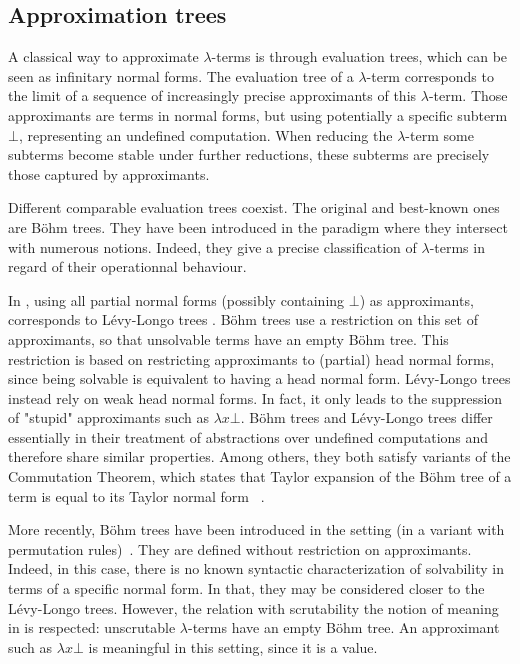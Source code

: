 \subsection{Approximation trees}\label{subsec:bohm-dbang}

A classical way to approximate $\lambda$-terms is through evaluation trees, which can be seen as infinitary normal forms. 
The evaluation tree of a $\lambda$-term corresponds to the limit of a sequence
of increasingly precise approximants of this $\lambda$-term. Those approximants
are terms in normal forms, but using potentially a specific subterm $\bot$,
representing an undefined computation. When reducing the $\lambda$-term some
subterms become stable under further reductions, these subterms are precisely
those captured by approximants. 

Different comparable evaluation trees coexist. The original and best-known ones are Böhm trees. They have been introduced in the \cbn{} paradigm where they intersect with numerous notions. Indeed, they give a precise classification of $\lambda$-terms in regard of their operationnal behaviour.

In \cbn{}, using all partial normal forms (possibly containing $\bot$) as approximants, corresponds to Lévy-Longo trees \cite{Longo83}. Böhm trees use a restriction on this set of approximants, so that unsolvable terms have an empty Böhm tree. This restriction is based on restricting approximants to (partial) head normal forms, since being solvable is equivalent to having a head normal form. Lévy-Longo trees instead rely on weak head normal forms. In fact, it only leads to the suppression of "stupid" approximants such as $\lambda x\bot$. Böhm trees and Lévy-Longo trees differ essentially in their treatment of abstractions over undefined computations and therefore share similar properties. Among others, they both satisfy variants of the Commutation Theorem, which states that Taylor expansion of the Böhm tree of a term is equal to its Taylor normal form ~\cite{ER08}.

More recently, Böhm trees have been introduced in the \cbv{} setting (in a variant with permutation rules)~\cite{kerinec:bohmTreeCbV}. 
They are defined without restriction on approximants. Indeed, in this case,
there is no known syntactic characterization of solvability in terms of a
specific normal form. In that, they may be considered closer to the Lévy-Longo
trees. However, the relation with scrutability \nativeemdash{} the notion of meaning \nativeemdash{} in
\cbv{} is respected: unscrutable $\lambda$-terms have an empty Böhm tree. An
approximant such as $\lambda x\bot$ is meaningful in this setting, since it is a
value.

